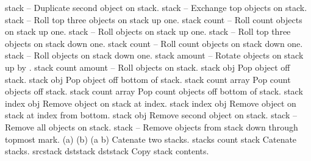 \begin{longtable}{}
	{stack}
	{{\bf {}}}
	{--}
	{Duplicate second object on stack.}
\hline
\optableent
	{stack}
	{{\bf {}}}
	{--}
	{Exchange top objects on stack.}
\hline
\optableent
	{stack}
	{{\bf {}}}
	{--}
	{Roll top three objects on stack up one.}
\hline
\optableent
	{stack count}
	{{\bf {}}}
	{--}
	{Roll count objects on stack up one.}
\hline
\optableent
	{stack}
	{{\bf {}}}
	{--}
	{Roll objects on stack up one.}
\hline
\optableent
	{stack}
	{{\bf {}}}
	{--}
	{Roll top three objects on stack down one.}
\hline
\optableent
	{stack count}
	{{\bf {}}}
	{--}
	{Roll count objects on stack down one.}
\hline
\optableent
	{stack}
	{{\bf {}}}
	{--}
	{Roll objects on stack down one.}
\hline
\optableent
	{stack amount}
	{{\bf {}}}
	{--}
	{Rotate objects on stack up by .}
\hline
\optableent
	{stack count amount}
	{{\bf {}}}
	{--}
	{Roll objects on stack.}
\hline
\optableent
	{stack}
	{{\bf {}}}
	{obj}
	{Pop object off stack.}
\hline
\optableent
	{stack}
	{{\bf {}}}
	{obj}
	{Pop object off bottom of stack.}
\hline
\optableent
	{stack count}
	{{\bf {}}}
	{array}
	{Pop count objects off stack.}
\hline
\optableent
	{stack count}
	{{\bf {}}}
	{array}
	{Pop count objects off bottom of stack.}
\hline
\optableent
	{stack index}
	{{\bf {}}}
	{obj}
	{Remove object on stack at index.}
\hline
\optableent
	{stack index}
	{{\bf {}}}
	{obj}
	{Remove object on stack at index from bottom.}
\hline
\optableent
	{stack}
	{{\bf {}}}
	{obj}
	{Remove second object on stack.}
\hline
\optableent
	{stack}
	{{\bf {}}}
	{--}
	{Remove all objects on stack.}
\hline
\optableent
	{stack}
	{{\bf {}}}
	{--}
	{Remove objects from stack down through topmost mark.}
\hline
\optableent
	{(a) (b)}
	{{\bf {}}}
	{(a b)}
	{Catenate two stacks.}
\hline
\optableent
	{stacks count}
	{{\bf {}}}
	{stack}
	{Catenate stacks.}
\hline
\optableent
	{srcstack dststack}
	{{\bf {}}}
	{dststack}
	{Copy stack contents.}
\hline \hline
{}
\end{longtable}
